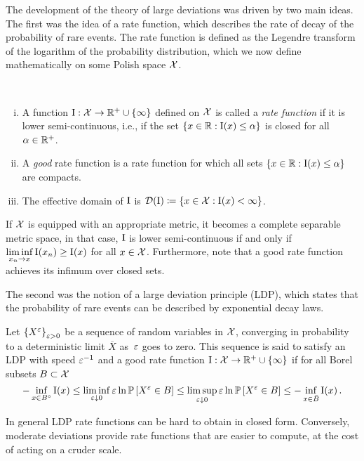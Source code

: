 The development of the theory of large deviations was driven by two main ideas. The first was the idea of a rate function, which describes the rate of decay of the probability of rare events. The rate function is defined as the Legendre transform of the logarithm of the probability distribution, which we now define mathematically on some Polish space $\mathcal{X}$.
\begin{definition}\ 
\begin{enumerate}[i)]
    \item A function $\mathrm{I}: \mathcal{X} \to \mathbb{R}^+ \cup \{\infty\}$ defined on $\mathcal{X}$ is called a \emph{rate function} if it is lower semi-continuous, i.e., if the set $\{ x \in \mathbb{R}: \mathrm{I} (x) \leq \alpha \}$ is closed for all $\alpha \in \mathbb{R}^+$.
    \item A \emph{good} rate function is a rate function for which all sets $\{ x \in \mathbb{R} : \mathrm{I} (x) \leq \alpha \}$ are compacts.
    \item The effective domain of $\mathrm{I}$ is $\mathcal{D}(\mathrm{I}) \coloneqq \{x \in \mathcal{X} : \mathrm{I}(x) < \infty \}$. 
\end{enumerate}
\end{definition}
\begin{remark}
If $\mathcal{X}$ is equipped with an appropriate metric, it becomes a complete separable metric space, in that case, $\mathrm{I}$ is lower semi-continuous if and only if $\liminf\limits_{x_n \rightarrow x} \mathrm{I}(x_n) \geq \mathrm{I}(x)$ for all $x \in \mathcal{X}$. Furthermore, note that a good rate function achieves its infimum over closed sets.
\end{remark}
The second was the notion of a large deviation principle (LDP), which states that the probability of rare events can be described by exponential decay laws.
\begin{definition}
Let $\left\{X^{\varepsilon}\right\}_{\varepsilon>0}$ be a sequence of random variables in $\mathcal{X}$, converging in probability to a deterministic limit $\overline{X}$ as~$\varepsilon$ goes to zero. This sequence is said to satisfy an LDP with speed $\varepsilon^{-1}$ and a good rate function $\mathrm{I}: \mathcal{X} \to \mathbb{R}^+ \cup \{\infty\}$ if for all Borel subsets $B \subset \mathcal{X}$
$$
-\inf _{x \in B^{\circ}} \mathrm{I}(x) \leq \liminf _{\varepsilon \downarrow 0} \varepsilon \ln \mathbb{P}\left[X^{\varepsilon} \in B\right] \leq \limsup _{\varepsilon \downarrow 0} \varepsilon \ln \mathbb{P}\left[X^{\varepsilon} \in B\right] \leq-\inf _{x \in \bar{B}} \mathrm{I}(x)\,.
$$
\end{definition}

In general LDP rate functions can be hard to obtain in closed form. Conversely, moderate deviations provide rate functions that are easier to compute, at the cost of acting on a cruder scale.

